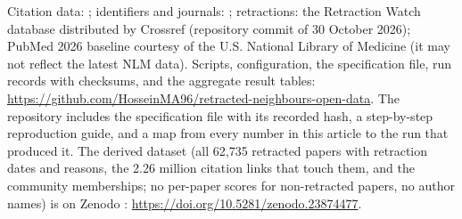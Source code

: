 Citation data: \citet{arjomandi2024dataset}; identifiers and journals: \citet{ocmeta2024dump}; retractions: the
Retraction Watch database distributed by Crossref (repository commit of 30 October 2026); PubMed 2026 baseline courtesy
of the U.S. National Library of Medicine (it may not reflect the latest NLM data). Scripts, configuration, the
specification file, run records with checksums, and the aggregate result tables:
\url{https://github.com/HosseinMA96/retracted-neighbours-open-data}. The repository includes the specification file
with its recorded hash, a step-by-step reproduction guide, and a map from every number in this article to the run that
produced it. The derived dataset (all 62,735 retracted papers with retraction dates and reasons, the 2.26 million citation
links that touch them, and the community memberships; no per-paper scores for non-retracted papers, no author names) is
on Zenodo \citep{arjomandi2026retracteddata}: \url{https://doi.org/10.5281/zenodo.23874477}.
